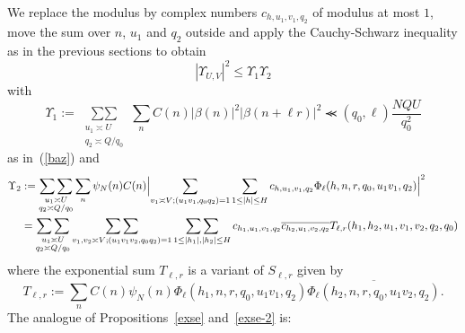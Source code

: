 \documentclass[12pt,a4paper,reqno]{amsart}
\numberwithin{equation}{section}
\theoremstyle{plain}
\theoremstyle{definition}
\newcommand\eps{\varepsilon}
\newcommand\sumsum{\mathop{\sum\sum}\limits}
\renewcommand{\sim}{\asymp}
\renewcommand{\lessapprox}{\llcurly}
\begin{document}
We replace the modulus by complex numbers $c_{h,u_1,v_1,q_2}$ of
modulus at most $1$, move the sum over $n$, $u_1$ and $q_2$ outside and apply
the Cauchy-Schwarz inequality as in the previous sections to obtain
$$
|\Upsilon_{U,V}|^2\leq \Upsilon_1\Upsilon_2
$$
with
$$
\Upsilon_1:=\sumsum_{\substack{u_1\sim U\\ q_2\sim Q/q_0}} \sum_n C(n)
|\beta(n)|^2|\beta(n+\ell r)|^2\lessapprox (q_0,\ell)\frac{NQU}{q_0^2}
$$
as in~(\ref{baz}) and
\begin{align*}
  \Upsilon_2&:= \sumsum_{\substack{u_1\sim U\\ q_2\sim Q/q_0}}
  \sum_{n}\psi_N(n)C(n) \Bigl| \sum_{v_1\sim V; (u_1v_1,q_0q_2)= 1}
  \sum_{1 \leq |h| \leq H} c_{h,u_1,v_1,q_2}
  \Phi_{\ell}(h,n, r, q_0, u_1v_1,q_2)\Bigr|^2\\
  &=\sumsum_{\substack{u_1\sim U\\q_2\sim Q/q_0}} 
  \sumsum_{v_1,v_2\sim V; (u_1v_1v_2,q_0q_2)= 1} \sumsum_{1\leq |h_1|,|h_2|\leq H}
  c_{h_1,u_1,v_1,q_2}\overline{c_{h_2,u_1,v_2,q_2}}
  T_{\ell,r}(h_1,h_2,u_1,v_1,v_2,q_2,q_0)
\end{align*}
where the exponential sum $T_{\ell,r}$ is a variant of $S_{\ell,r}$ given by
\begin{equation}\label{eq-tell}
T_{\ell,r} :=\sum_n C(n)\psi_N(n) \Phi_{\ell}(h_1,n, r,q_0,u_1v_1, q_2)
\overline{ \Phi_{\ell}(h_2,n, r,q_0,u_1v_2,q_2)}.
\end{equation}
The analogue of Propositions~\ref{exse} and~\ref{exse-2} is:
\end{document}
